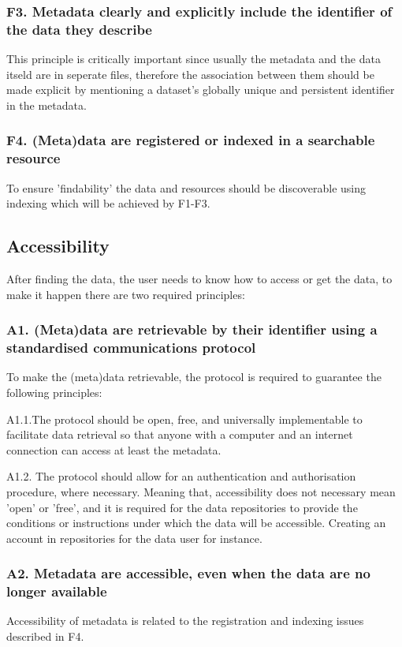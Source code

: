 \subsubsection*{F3. Metadata clearly and explicitly include the identifier of the data they describe}
This principle is critically important since usually the metadata and the data itseld are in seperate files, therefore the association between them should be made explicit by mentioning a dataset’s globally unique and persistent identifier in the metadata. 
\subsubsection*{F4. (Meta)data are registered or indexed in a searchable resource}
To ensure 'findability' the data and resources should be discoverable using indexing which will be achieved by F1-F3.

\subsection*{Accessibility}
After finding the data, the user needs to know how to access or get the data, to make it happen there are two required principles:

\subsubsection*{A1. (Meta)data are retrievable by their identifier using a standardised communications protocol}
To make the (meta)data retrievable, the protocol is required to guarantee the following principles: 

\quad A1.1.The protocol should be open, free, and universally implementable to facilitate data retrieval so that anyone with a computer and an internet connection can access at least the metadata.

\quad A1.2. The protocol should allow for an authentication and authorisation procedure, where necessary. Meaning that, accessibility does not necessary mean 'open' or 'free', and it is required for the data repositories to provide the conditions or instructions under which the data will be accessible. Creating an account in repositories for the data user for instance.

\subsubsection*{A2. Metadata are accessible, even when the data are no longer available}  Accessibility of metadata is related to the registration and indexing issues described in F4. 


